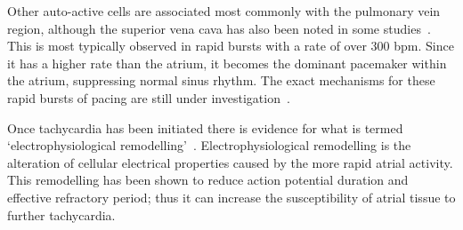 Other auto-active cells are associated most commonly with the pulmonary vein
region, although the superior vena cava has also been noted in some
studies~\cite{Tsai2000}.
This is most typically observed in rapid bursts with a rate of over 300 bpm.
Since it has a higher rate than the atrium, it becomes the dominant pacemaker
within the atrium, suppressing normal sinus rhythm.
The exact mechanisms for these rapid bursts of pacing are still under
investigation~\cite{Chen2000}.

Once tachycardia has been initiated there is evidence for what is termed
`electrophysiological remodelling'~\cite{Stott2008,Workman2005,Bosch1999}.
Electrophysiological remodelling is the alteration of cellular electrical
properties caused by the more rapid atrial activity.
This remodelling has been shown to reduce action potential duration and
effective refractory period; thus it can increase the susceptibility of atrial
tissue to further tachycardia.



